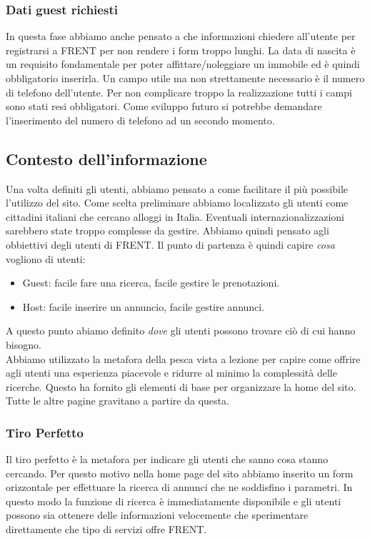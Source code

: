 \documentclass[1_relazione.tex]{subfiles}
\begin{document}
\subsubsection{Dati guest richiesti}
In questa fase abbiamo anche pensato a che informazioni chiedere all'utente per registrarsi a FRENT per non rendere i form troppo lunghi. La data di nascita è un requisito fondamentale per poter affittare/noleggiare un immobile ed è quindi obbligatorio inserirla. Un campo utile ma non strettamente necessario è il numero di telefono dell'utente. Per non complicare troppo la realizzazione tutti i campi sono stati resi obbligatori. Come sviluppo futuro si potrebbe demandare l'inserimento del numero di telefono ad un secondo momento.

\subsection{Contesto dell'informazione }
Una volta definiti gli utenti, abbiamo pensato a come facilitare il pi\`{u} possibile l'utilizzo del sito. Come scelta preliminare abbiamo localizzato gli utenti come cittadini italiani che cercano alloggi in Italia. Eventuali internazionalizzazioni sarebbero state troppo complesse da gestire. Abbiamo quindi pensato agli obbiettivi degli utenti di FRENT.  Il punto di partenza \`{e} quindi capire \textit{cosa} vogliono di utenti:

\begin{itemize}
\item Guest: facile fare una ricerca, facile gestire le prenotazioni.
\item Host: facile inserire un annuncio, facile gestire annunci.
\end{itemize}

A questo punto abiamo definito \textit{dove} gli utenti possono trovare ciò di cui hanno bisogno.\\ Abbiamo utilizzato la metafora della pesca vista a lezione per capire come offrire agli utenti una esperienza piacevole e ridurre al minimo la complessità delle ricerche. Questo ha fornito gli elementi di base per organizzare la home del sito. Tutte le altre pagine gravitano a partire da questa.

\subsubsection{Tiro Perfetto} 
Il tiro perfetto è la metafora per indicare gli utenti che sanno cosa stanno cercando. Per questo motivo nella home page del sito abbiamo inserito un form orizzontale per effettuare la ricerca di annunci che ne soddisfino i parametri. In questo modo la funzione di ricerca è immediatamente disponibile e gli utenti possono sia ottenere delle informazioni velocemente che sperimentare direttamente che tipo di servizi offre FRENT.
 
\end{document}

